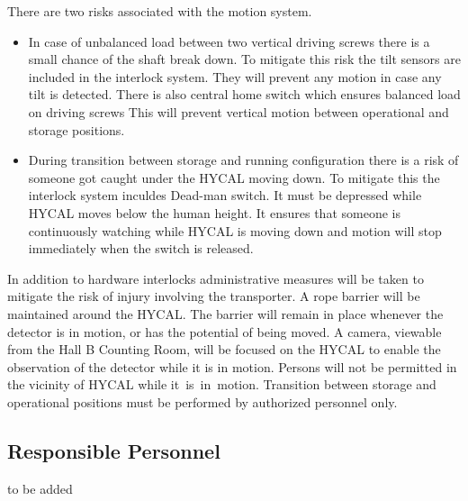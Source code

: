 There are two risks associated with the motion system.
\begin{itemize}
\item In case of unbalanced load between two vertical driving screws there is a small chance of the shaft break down. To mitigate this risk the tilt sensors are included in the interlock system. They will prevent any motion in case any tilt is detected. There is also central home switch which ensures balanced load on driving screws This will prevent vertical motion between operational and storage positions.
\item During transition between storage and running configuration there is a risk of someone got caught under the HYCAL moving down. 
To mitigate this the interlock system inculdes Dead-man switch. It must be depressed while HYCAL moves below the human height. It ensures that someone is continuously watching while HYCAL is moving down and motion will stop immediately when the switch is released.
\end{itemize}
In addition to hardware interlocks administrative measures will be taken to mitigate the risk of injury involving the transporter.
A rope barrier will be maintained around the HYCAL. The barrier will
remain in place whenever the detector is in motion, or has the potential of
being moved. A camera, viewable from the Hall B Counting Room, will be
focused on the HYCAL to enable the observation of the detector while it is in
motion. Persons will not be permitted in the vicinity of HYCAL while \mbox{it is in motion.} Transition between storage and operational positions must be performed by authorized personnel only.

\subsection{Responsible Personnel}

to be added